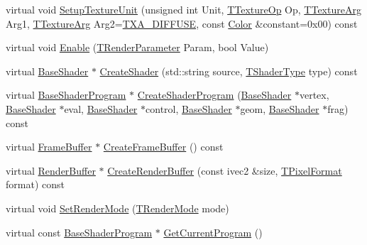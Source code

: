 \begin{DoxyCompactItemize}
virtual void \hyperlink{class_agmd_1_1_g_l_driver_aab0483f33db17738214722b823c602ca}{Setup\+Texture\+Unit} (unsigned int Unit, \hyperlink{namespace_agmd_aafbdbe5caf9cc8574624faa1943bf5ef}{T\+Texture\+Op} Op, \hyperlink{namespace_agmd_ace3617cd312c454f60b4511e3e873db5}{T\+Texture\+Arg} Arg1, \hyperlink{namespace_agmd_ace3617cd312c454f60b4511e3e873db5}{T\+Texture\+Arg} Arg2=\hyperlink{namespace_agmd_ace3617cd312c454f60b4511e3e873db5a3b6eaeb8bc6375565b086e228263c2ee}{T\+X\+A\+\_\+\+D\+I\+F\+F\+U\+S\+E}, const \hyperlink{class_agmd_utilities_1_1_color}{Color} \&constant=0x00) const 
\item 
virtual void \hyperlink{class_agmd_1_1_g_l_driver_a0f7dc8a8dd0a35f456abf04748d674ba}{Enable} (\hyperlink{namespace_agmd_afc630cffacc9bfc42e46816feb4744ae}{T\+Render\+Parameter} Param, bool Value)
\item 
virtual \hyperlink{class_agmd_1_1_base_shader}{Base\+Shader} $\ast$ \hyperlink{class_agmd_1_1_g_l_driver_ab2e9dad9e27f72a8e45313b4cdd757e9}{Create\+Shader} (std\+::string source, \hyperlink{namespace_agmd_a162a493eaff1589f07a505806e6724b4}{T\+Shader\+Type} type) const 
\item 
virtual \hyperlink{class_agmd_1_1_base_shader_program}{Base\+Shader\+Program} $\ast$ \hyperlink{class_agmd_1_1_g_l_driver_a06554eb69eba097702bdef7f64a6cb9a}{Create\+Shader\+Program} (\hyperlink{class_agmd_1_1_base_shader}{Base\+Shader} $\ast$vertex, \hyperlink{class_agmd_1_1_base_shader}{Base\+Shader} $\ast$eval, \hyperlink{class_agmd_1_1_base_shader}{Base\+Shader} $\ast$control, \hyperlink{class_agmd_1_1_base_shader}{Base\+Shader} $\ast$geom, \hyperlink{class_agmd_1_1_base_shader}{Base\+Shader} $\ast$frag) const 
\item 
virtual \hyperlink{class_agmd_1_1_frame_buffer}{Frame\+Buffer} $\ast$ \hyperlink{class_agmd_1_1_g_l_driver_af7da1b0074515ed7aa2b9837bf2c1319}{Create\+Frame\+Buffer} () const 
\item 
virtual \hyperlink{class_agmd_1_1_render_buffer}{Render\+Buffer} $\ast$ \hyperlink{class_agmd_1_1_g_l_driver_a09cb3cec6ed1df5ff40e5fc67cb8d222}{Create\+Render\+Buffer} (const ivec2 \&size, \hyperlink{namespace_agmd_afc48fd9fa5dccb4c5621c052bfd1a7ec}{T\+Pixel\+Format} format) const 
\item 
virtual void \hyperlink{class_agmd_1_1_g_l_driver_a4b7766cf2ffe53b71a6de1a76b8272de}{Set\+Render\+Mode} (\hyperlink{namespace_agmd_aa4cbd15e55e815e187c31a8f435addae}{T\+Render\+Mode} mode)
\item 
virtual const \hyperlink{class_agmd_1_1_base_shader_program}{Base\+Shader\+Program} $\ast$ \hyperlink{class_agmd_1_1_g_l_driver_a103a7d4d5a67c924c3e25a494cdb19d6}{Get\+Current\+Program} ()

\end{DoxyCompactItemize}
